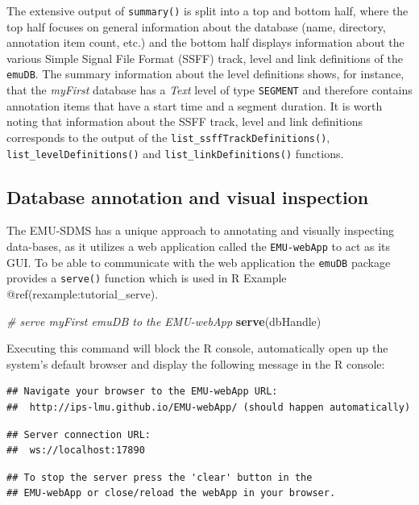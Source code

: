 \documentclass[]{book}
\newenvironment{Shaded}{\begin{snugshade}}{\end{snugshade}}
\newcommand{\KeywordTok}[1]{\textcolor[rgb]{0.13,0.29,0.53}{\textbf{{#1}}}}
\newcommand{\CommentTok}[1]{\textcolor[rgb]{0.56,0.35,0.01}{\textit{{#1}}}}
\newcommand{\NormalTok}[1]{{#1}}
\theoremstyle{definition}
\theoremstyle{definition}
\theoremstyle{definition}
\theoremstyle{remark}
\begin{document}
The extensive output of \texttt{summary()} is split into a top and
bottom half, where the top half focuses on general information about the
database (name, directory, annotation item count, etc.) and the bottom
half displays information about the various Simple Signal File Format
(SSFF) track, level and link definitions of the \texttt{emuDB}. The
summary information about the level definitions shows, for instance,
that the \emph{myFirst} database has a \emph{Text} level of type
\texttt{SEGMENT} and therefore contains annotation items that have a
start time and a segment duration. It is worth noting that information
about the SSFF track, level and link definitions corresponds to the
output of the \texttt{list\_ssffTrackDefinitions()},
\texttt{list\_levelDefinitions()} and \texttt{list\_linkDefinitions()}
functions.

\subsection{Database annotation and visual
inspection}\label{database-annotation-and-visual-inspection}

The EMU-SDMS has a unique approach to annotating and visually inspecting
data-bases, as it utilizes a web application called the
\texttt{EMU-webApp} to act as its GUI. To be able to communicate with
the web application the \texttt{emuDB} package provides a
\texttt{serve()} function which is used in R Example
@ref(rexample:tutorial\_serve).

\begin{Shaded}
\begin{Highlighting}[]
\CommentTok{# serve myFirst emuDB to the EMU-webApp}
\KeywordTok{serve}\NormalTok{(dbHandle)}
\end{Highlighting}
\end{Shaded}

Executing this command will block the R console, automatically open up
the system's default browser and display the following message in the R
console:

\begin{verbatim}
## Navigate your browser to the EMU-webApp URL: 
##  http://ips-lmu.github.io/EMU-webApp/ (should happen automatically)
\end{verbatim}

\begin{verbatim}
## Server connection URL: 
##  ws://localhost:17890
\end{verbatim}

\begin{verbatim}
## To stop the server press the 'clear' button in the 
## EMU-webApp or close/reload the webApp in your browser.
\end{verbatim}
\end{document}
